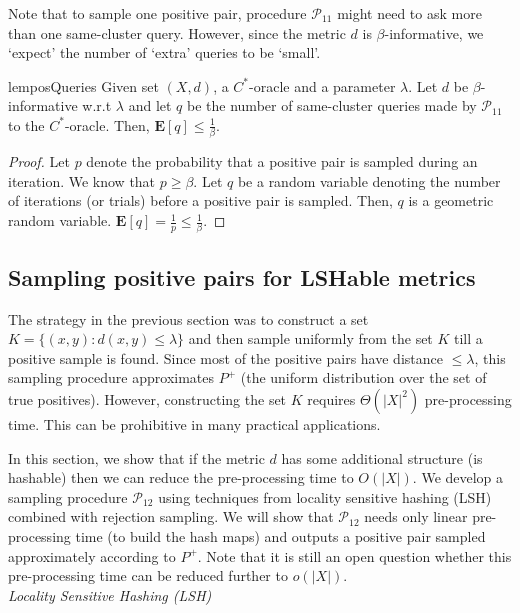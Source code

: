 \documentclass[12pt]{article}
\newcommand{\mb}{\mathbf}
\newcommand{\mc}{\mathcal}
\begin{document}
\noindent Note that to sample one positive pair, procedure $\mc P_{11}$ might need to ask more than one same-cluster query. However, since the metric $d$ is $\beta$-informative, we `expect' the number of `extra' queries to be `small'. 

\begin{restatable}{lem}{posQueries}
\label{lemma:posQueries}
Given set $(X, d)$, a $C^*$-oracle and a parameter $\lambda$. Let $d$ be $\beta$-informative w.r.t $\lambda$ and let $q$ be the number of same-cluster queries made by $\mc P_{11}$ to the $C^*$-oracle. Then, $\mb E[q] \le \frac{1}{\beta}$.
\end{restatable}
\begin{proof}
Let $p$ denote the probability that a positive pair is sampled during an iteration. We know that $p \ge \beta$. Let $q$ be a random variable denoting the number of iterations (or trials) before a positive pair is sampled. Then, $q$ is a geometric random variable. $\mb E[q] = \frac{1}{p} \le \frac{1}{\beta}$.
\end{proof}

\subsection{Sampling positive pairs for LSHable metrics}
\label{section:samplingPositiveLSHable}

The strategy in the previous section was to construct a set $K = \{(x, y): d(x, y) \le \lambda\}$ and then sample uniformly from the set $K$ till a positive sample is found. Since most of the positive pairs have distance $\le \lambda$, this sampling procedure approximates $P^+$ (the uniform distribution over the set of true positives). However, constructing the set $K$ requires $\Theta(|X|^2)$ pre-processing time. This can be prohibitive in many practical applications. 

In this section, we show that if the metric $d$ has some additional structure (is hashable) then we can reduce the pre-processing time to $O(|X|)$. We develop a sampling procedure $\mc P_{12}$ using techniques from locality sensitive hashing (LSH) combined with rejection sampling. We will show that $\mc P_{12}$ needs only linear pre-processing time (to build the hash maps) and outputs a positive pair sampled approximately according to $P^+$. Note that it is still an open question whether this pre-processing time can be reduced further to $o(|X|)$.\\

\noindent\textit{Locality Sensitive Hashing (LSH)}
\end{document}
